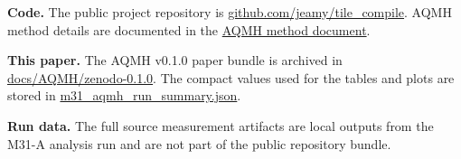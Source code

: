 \documentclass[10pt,twocolumn]{article}
\begin{document}
\textbf{Code.}
The public project repository is
\href{https://github.com/jeamy/tile_compile}{github.com/jeamy/tile\_compile}. AQMH method details
are documented in the
\href{https://github.com/jeamy/tile_compile/blob/master/docs/AQMH/aqmh_methodik_en.md}{AQMH
method document}.

\textbf{This paper.}
The AQMH v0.1.0 paper bundle is archived in
\href{https://github.com/jeamy/tile_compile/tree/master/docs/AQMH/zenodo-0.1.0}{docs/AQMH/zenodo-0.1.0}.
The compact values used for the tables and plots are stored in
\href{https://github.com/jeamy/tile_compile/blob/master/docs/AQMH/zenodo-0.1.0/m31_aqmh_run_summary.json}{m31\_aqmh\_run\_summary.json}.

\textbf{Run data.}
The full source measurement artifacts are local outputs from the M31-A analysis run and are not
part of the public repository bundle.
\end{document}
